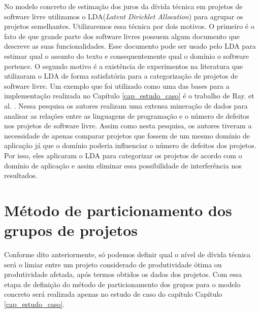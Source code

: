No modelo concreto de estimação dos juros da dívida técnica em projetos de software livre utilizamos o LDA(\textit{Latent Dirichlet Allocation}) para agrupar os projetos semelhantes. Utilizaremos essa técnica por dois motivos. O primeiro é o fato de que grande parte dos software livres possuem algum documento que descreve as suas funcionalidades. Esse documento pode ser usado pelo LDA para estimar qual o assunto do texto e consequentemente qual o domínio o software pertence. O segundo motivo é a existência de experimentos na literatura que utilizaram o LDA de forma satisfatória para a categorização de projetos de software livre. Um exemplo que foi utilizado como uma das bases para a implementação realizada no Capítulo \ref{cap_estudo_caso}  é o trabalho de Ray. et al. \cite{ray2014large}. Nessa pesquisa os autores realizam uma extensa mineração de dados para analisar as relações entre as linguagens de programação e o número de defeitos nos projetos de software livre. Assim como nesta pesquisa, os autores tiveram a necessidade de apenas comparar projetos que fossem de um mesmo domínio de aplicação já que o domínio poderia influenciar o número de defeitos dos projetos. Por isso, eles aplicaram o LDA para categorizar os projetos de acordo com o domínio de aplicação e assim eliminar essa possibilidade de interferência nos resultados.

\section{Método de particionamento dos grupos de projetos}

Conforme dito anteriormente, só podemos definir qual o nível de dívida técnica será o limiar entre um projeto considerado de produtividade ótima ou produtividade afetada, após termos obtidos os dados dos projetos. Com essa etapa de definição do método de particionamento dos grupos para o modelo concreto será realizada apenas no estudo de caso do capítulo  Capítulo \ref{cap_estudo_caso}.






 
 
 